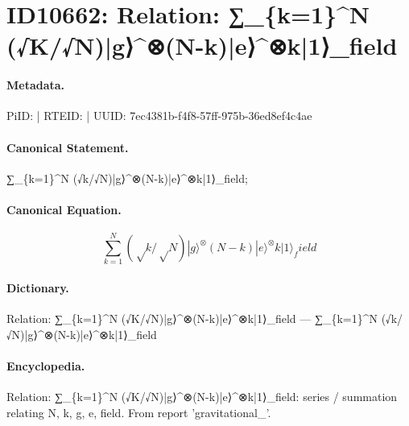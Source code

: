 \section*{ID10662: Relation: ∑\_\{k=1\}\textasciicircum{}N (√K/√N)|g⟩\textasciicircum{}⊗(N-k)|e⟩\textasciicircum{}⊗k|1⟩\_field}
\paragraph{Metadata.}
PiID:  | RTEID:  | UUID: 7ec4381b-f4f8-57ff-975b-36ed8ef4c4ae

\paragraph{Canonical Statement.}
∑\_\{k=1\}\textasciicircum{}N (√k/√N)|g⟩\textasciicircum{}⊗(N-k)|e⟩\textasciicircum{}⊗k|1⟩\_field;

\paragraph{Canonical Equation.}
\[
∑_{k=1}^N (√k/√N)|g⟩^⊗(N-k)|e⟩^⊗k|1⟩_field
\]

\paragraph{Dictionary.}
Relation: ∑\_\{k=1\}\textasciicircum{}N (√K/√N)|g⟩\textasciicircum{}⊗(N-k)|e⟩\textasciicircum{}⊗k|1⟩\_field — ∑\_\{k=1\}\textasciicircum{}N (√k/√N)|g⟩\textasciicircum{}⊗(N-k)|e⟩\textasciicircum{}⊗k|1⟩\_field

\paragraph{Encyclopedia.}
Relation: ∑\_\{k=1\}\textasciicircum{}N (√K/√N)|g⟩\textasciicircum{}⊗(N-k)|e⟩\textasciicircum{}⊗k|1⟩\_field: series / summation relating N, k, g, e, field. From report 'gravitational\_'.
